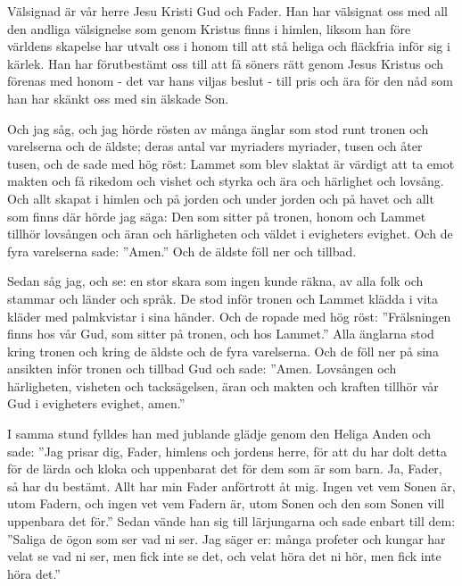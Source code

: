 {Välsignad är vår herre Jesu Kristi Gud och Fader. Han har välsignat oss med all den andliga välsignelse som genom Kristus finns i himlen,
liksom han före världens skapelse har utvalt oss i honom till att stå heliga och fläckfria inför sig i kärlek.
Han har förutbestämt oss till att få söners rätt genom Jesus Kristus och förenas med honom - det var hans viljas beslut -
till pris och ära för den nåd som han har skänkt oss med sin älskade Son.}


{
Och jag såg, och jag hörde rösten av många änglar som stod runt tronen och varelserna och de äldste; deras antal var myriaders myriader, tusen och åter tusen,
och de sade med hög röst: Lammet som blev slaktat är värdigt att ta emot makten och få rikedom och vishet och styrka och ära och härlighet och lovsång.
Och allt skapat i himlen och på jorden och under jorden och på havet och allt som finns där hörde jag säga: Den som sitter på tronen, honom och Lammet tillhör lovsången och äran och härligheten och väldet i evigheters evighet.
Och de fyra varelserna sade: ”Amen.” Och de äldste föll ner och tillbad.}


{
Sedan såg jag, och se: en stor skara som ingen kunde räkna, av alla folk och stammar och länder och språk. De stod inför tronen och Lammet klädda i vita kläder med palmkvistar i sina händer.
Och de ropade med hög röst: ”Frälsningen finns hos vår Gud, som sitter på tronen, och hos Lammet.”
Alla änglarna stod kring tronen och kring de äldste och de fyra varelserna. Och de föll ner på sina ansikten inför tronen och tillbad Gud
och sade: ”Amen. Lovsången och härligheten, visheten och tacksägelsen, äran och makten och kraften tillhör vår Gud i evigheters evighet, amen.”}


{I samma stund fylldes han med jublande glädje genom den Heliga Anden och sade: ”Jag prisar dig, Fader, himlens och jordens herre, för att du har dolt detta för de lärda och kloka och uppenbarat det för dem som är som barn. Ja, Fader, så har du bestämt.
Allt har min Fader anförtrott åt mig. Ingen vet vem Sonen är, utom Fadern, och ingen vet vem Fadern är, utom Sonen och den som Sonen vill uppenbara det för.”
Sedan vände han sig till lärjungarna och sade enbart till dem: ”Saliga de ögon som ser vad ni ser.
Jag säger er: många profeter och kungar har velat se vad ni ser, men fick inte se det, och velat höra det ni hör, men fick inte höra det.”}



